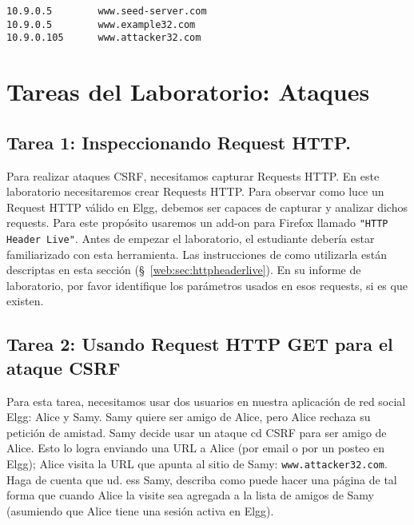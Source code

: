 \begin{lstlisting}
10.9.0.5        www.seed-server.com
10.9.0.5        www.example32.com
10.9.0.105      www.attacker32.com
\end{lstlisting}


\vspace{-0.1in}



\vspace{-0.1in}



\section{Tareas del Laboratorio: Ataques}


\subsection{Tarea 1: Inspeccionando Request HTTP.}

Para realizar ataques CSRF, necesitamos capturar Requests HTTP.
En este laboratorio necesitaremos crear Requests HTTP. 
Para observar como luce un Request HTTP válido en Elgg, debemos ser capaces de capturar y analizar dichos requests.
Para este propósito usaremos un add-on para Firefox llamado \texttt{"HTTP Header Live"}. Antes de empezar el laboratorio, el estudiante debería estar familiarizado con esta herramienta.
Las instrucciones de como utilizarla están descriptas en esta sección (\S~\ref{web:sec:httpheaderlive}). En su informe de laboratorio, por favor identifique los parámetros usados en esos requests, si es que existen.


\subsection{Tarea 2: Usando Request HTTP GET para el ataque CSRF}

Para esta tarea, necesitamos usar dos usuarios en nuestra aplicación de red social Elgg: Alice y Samy. Samy quiere ser amigo de Alice, pero Alice rechaza su petición de amistad. Samy decide usar un ataque cd CSRF para ser amigo de Alice. Esto lo logra enviando una URL a Alice (por email o por un posteo en Elgg); Alice visita la URL que apunta al sitio de Samy: \texttt{www.attacker32.com}.
Haga de cuenta que ud. ess Samy, describa como puede hacer una página de tal forma que cuando Alice la visite sea agregada a la lista de amigos de Samy (asumiendo que Alice tiene una sesión activa en Elgg).


